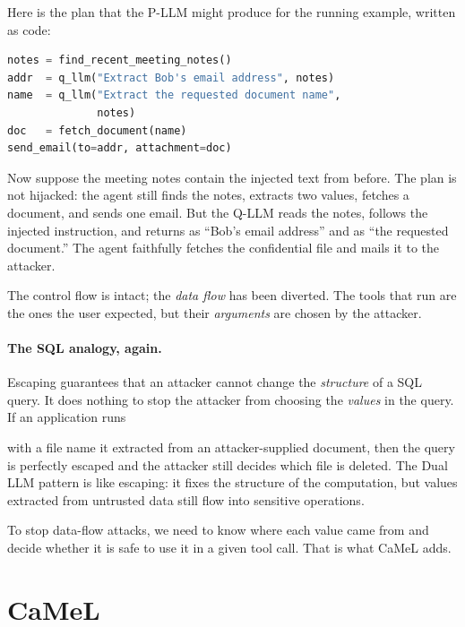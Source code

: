 Here is the plan that the P-LLM might produce for the running example,
written as code:
\begin{lstlisting}[language=python,style=camel]
notes = find_recent_meeting_notes()
addr  = q_llm("Extract Bob's email address", notes)
name  = q_llm("Extract the requested document name",
              notes)
doc   = fetch_document(name)
send_email(to=addr, attachment=doc)
\end{lstlisting}
Now suppose the meeting notes contain the injected text from before.
The plan is not hijacked: the agent still finds the notes, extracts two
values, fetches a document, and sends one email.
But the Q-LLM reads the notes, follows the injected instruction, and
returns  as ``Bob's email address'' and
 as ``the requested document.''
The agent faithfully fetches the confidential file and mails it to the
attacker.

The control flow is intact; the \emph{data flow} has been diverted.
The tools that run are the ones the user expected, but their
\emph{arguments} are chosen by the attacker.

\paragraph{The SQL analogy, again.}
Escaping guarantees that an attacker cannot change the \emph{structure}
of a SQL query.
It does nothing to stop the attacker from choosing the \emph{values} in
the query.
If an application runs
\begin{quote}
\end{quote}
with a file name it extracted from an attacker-supplied document, then
the query is perfectly escaped and the attacker still decides which file
is deleted.
The Dual LLM pattern is like escaping: it fixes the structure of the
computation, but values extracted from untrusted data still flow into
sensitive operations.

To stop data-flow attacks, we need to know where each value came from
and decide whether it is safe to use it in a given tool call.
That is what CaMeL adds.

\section{CaMeL}
\label{sec:camel:design}

